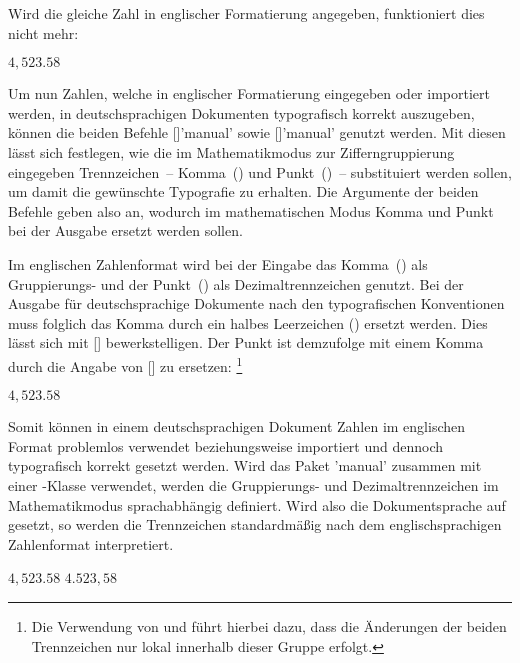 \documentclass[english,ngerman]{tudscrartcl}
\begin{document}
\begin{Bundle}{}
\begin{Trunk*}
\end{Trunk*}
%
Wird die gleiche Zahl in englischer Formatierung angegeben, funktioniert dies 
nicht mehr:
%
\begin{Trunk*}
\(4,523.58\)

\end{Trunk*}
%
Um nun Zahlen, welche in englischer Formatierung eingegeben oder importiert 
werden, in deutschsprachigen Dokumenten typografisch korrekt auszugeben, können
die beiden Befehle [\PParameter{\dots}]'manual' sowie 
[\PParameter{\dots}]'manual' genutzt werden. Mit diesen lässt 
sich festlegen, wie die im Mathematikmodus zur Zifferngruppierung eingegeben 
Trennzeichen~-- Komma~(\PValue{,}) und Punkt~()~-- substituiert 
werden sollen, um damit die gewünschte Typografie zu erhalten. Die Argumente 
der beiden Befehle geben also an, wodurch im mathematischen Modus Komma und 
Punkt bei der Ausgabe ersetzt werden sollen.

Im englischen Zahlenformat wird bei der Eingabe das Komma~(\PValue{,}) als 
Gruppierungs- und der Punkt~() als Dezimaltrennzeichen genutzt. Bei 
der Ausgabe für deutschsprachige Dokumente nach den typografischen Konventionen 
muss folglich das Komma durch ein halbes Leerzeichen (\Macro*{,}) ersetzt 
werden. Dies lässt sich mit [\PParameter{\Macro*{,}}] 
bewerkstelligen. Der Punkt ist demzufolge mit einem Komma durch die Angabe von
[\PParameter{,}] zu ersetzen:%
\footnote{%
  Die Verwendung von  und  führt hierbei 
  dazu, dass die Änderungen der beiden Trennzeichen nur lokal innerhalb dieser 
  Gruppe erfolgt.
}
%
\begin{Trunk*}
\begingroup
  \commaswap{\,}
  \dotswap{,}
  \(4,523.58\)
\endgroup

\end{Trunk*}
%
Somit können in einem deutschsprachigen Dokument Zahlen im englischen Format 
problemlos verwendet beziehungsweise importiert und dennoch typografisch 
korrekt gesetzt werden.
%
%
Wird das Paket 'manual' zusammen mit einer \TUDScript-Klasse 
verwendet, werden die Gruppierungs- und Dezimaltrennzeichen im Mathematikmodus 
sprachabhängig definiert. Wird also die Dokumentsprache auf  
gesetzt, so werden die Trennzeichen standardmäßig nach dem englischsprachigen 
Zahlenformat interpretiert.
%
\begin{Trunk*}
\begingroup
  \(4,523.58\)\newline
  \(4.523,58\)
\endgroup


\end{Trunk*}
\end{Bundle}
\end{document}
